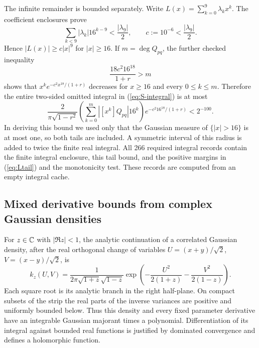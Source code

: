 The infinite remainder is bounded separately. Write
$L(x)=\sum_{k=0}^9\lambda_k x^k$. The coefficient enclosures prove
\begin{equation}\label{eq:Ltail}
 \sum_{k<9}|\lambda_k|16^{k-9}<\frac{|\lambda_9|}{2},
 \qquad c:=10^{-6}<\frac{|\lambda_9|}{2}.
\end{equation}
Hence $|L(x)|\geq c|x|^9$ for $|x|\geq16$. If
$m=\deg Q_{pq}$, the further checked inequality
\[
 \frac{18c^2 16^{18}}{1+r}>m
\]
shows that $x^ke^{-c^2x^{18}/(1+r)}$ decreases for $x\geq16$ and
every $0\leq k\leq m$. Therefore the entire two-sided omitted integral
in (\ref{eq:S-integral}) is at most
\begin{equation}\label{eq:S-tail}
 \frac{2}{\pi\sqrt{1-r^2}}
   \left(\sum_{k=0}^m|[x^k]Q_{pq}|16^k\right)
       e^{-c^2 16^{18}/(1+r)}<2^{-100}.
\end{equation}
In deriving this bound we used only that the Gaussian measure of
$\{|x|>16\}$ is at most one, so both tails are included. A symmetric
interval of this radius is added to twice the finite real integral.
All 266 required integral records contain the finite integral enclosure,
this tail bound, and the positive margins in (\ref{eq:Ltail}) and the
monotonicity test. These records are computed from an empty integral
cache.

\subsection{Mixed derivative bounds from complex Gaussian densities}
For $z\in\mathbb C$ with $|\Re z|<1$, the analytic continuation of a correlated
Gaussian density, after the real orthogonal change of variables
$U=(x+y)/\sqrt2$, $V=(x-y)/\sqrt2$, is
\[
 k_z(U,V)=\frac{1}{2\pi\sqrt{1+z}\sqrt{1-z}}
       \exp\left(-\frac{U^2}{2(1+z)}-\frac{V^2}{2(1-z)}\right).
\]
Each square root is its analytic branch in the right half-plane.
On compact subsets of the strip the real parts of the inverse variances
are positive and uniformly bounded below. Thus this density and every
fixed parameter derivative have an integrable Gaussian majorant times
a polynomial. Differentiation of its integral against bounded real
functions is justified by dominated convergence and defines a
holomorphic function.

